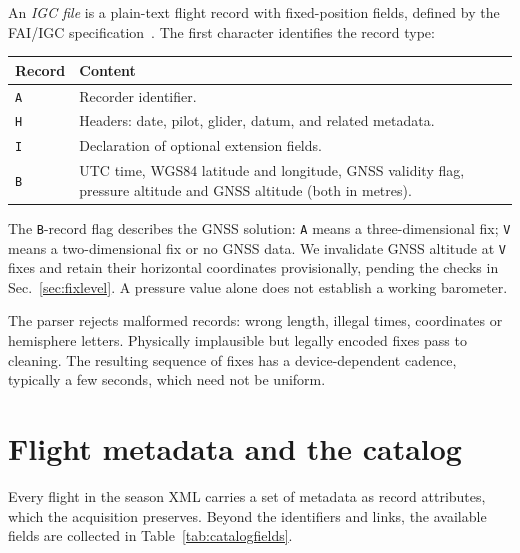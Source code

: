 \begin{revblock}
An \emph{IGC file} is a plain-text flight record with fixed-position fields,
defined by the FAI/IGC specification~\cite{fai_igc_spec}. The first character
identifies the record type:
\begin{center}
\begin{tabularx}{\linewidth}{@{}l X@{}}
\toprule
\textbf{Record} & \textbf{Content} \\
\midrule
\texttt{A} & Recorder identifier. \\
\texttt{H} & Headers: date, pilot, glider, datum, and related metadata. \\
\texttt{I} & Declaration of optional extension fields. \\
\texttt{B} & UTC time, WGS84 latitude and longitude, GNSS validity flag,
pressure altitude and GNSS altitude (both in metres). \\
\bottomrule
\end{tabularx}
\end{center}

The \texttt{B}-record flag describes the GNSS solution: \texttt{A} means a
three-dimensional fix; \texttt{V} means a two-dimensional fix or no GNSS data.
We invalidate GNSS altitude at \texttt{V} fixes and retain their horizontal
coordinates provisionally, pending the checks in Sec.~\ref{sec:fixlevel}.
A pressure value alone does not establish a working barometer.

The parser rejects malformed records: wrong length, illegal times, coordinates or
hemisphere letters. Physically implausible but legally encoded fixes pass to cleaning.
The resulting sequence of fixes has a device-dependent cadence, typically a few
seconds, which need not be uniform.

\end{revblock}

\section{Flight metadata and the catalog}
\label{sec:catalog}

Every flight in the season XML carries a set of metadata as record attributes, which the
acquisition preserves. Beyond the identifiers and links, the available fields are
collected in Table~\ref{tab:catalogfields}.

